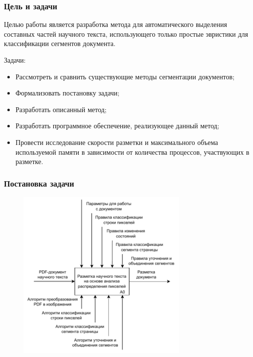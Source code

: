 \documentclass[gray]{beamer}
\begin{document}
\begin{frame}
    \frametitle{Цель и задачи}
    Целью работы является разработка метода для автоматического выделения составных частей научного текста, использующего только простые эвристики для классификации сегментов документа.

    Задачи:
    \begin{itemize}
        \item Рассмотреть и сравнить существующие методы сегментации документов;
        \item Формализовать постановку задачи;
        \item Разработать описанный метод;
        \item Разработать программное обеспечение, реализующее данный метод;
        \item Провести исследование скорости разметки и максимального объема используемой памяти в зависимости от количества процессов, участвующих в разметке.
    \end{itemize}
    
\end{frame}

\begin{frame}
    \frametitle{Постановка задачи}
    \begin{figure}[H]
        \begin{center}
            \includegraphics[width=0.75\textwidth]{diag/a0.pdf}
        \end{center}
    \end{figure}

\end{frame}
\end{document}
